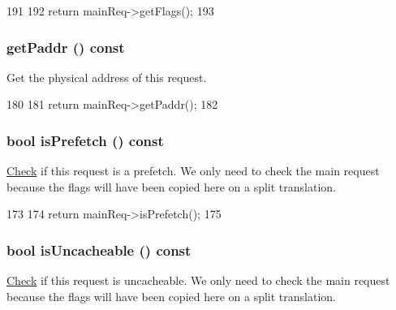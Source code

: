 \begin{DoxyCode}
191     {
192         return mainReq->getFlags();
193     }
\end{DoxyCode}
\hypertarget{classWholeTranslationState_ad988a42a876d1cbc56556e1317e0f107}{
\subsubsection[{getPaddr}]{ getPaddr () const}}
\label{classWholeTranslationState_ad988a42a876d1cbc56556e1317e0f107}
Get the physical address of this request. 


\begin{DoxyCode}
180     {
181         return mainReq->getPaddr();
182     }
\end{DoxyCode}
\hypertarget{classWholeTranslationState_a1eef1bb814a1f77346aba1648fb6d1c9}{
\subsubsection[{isPrefetch}]{\setlength{\rightskip}{0pt plus 5cm}bool isPrefetch () const}}
\label{classWholeTranslationState_a1eef1bb814a1f77346aba1648fb6d1c9}
\hyperlink{classCheck}{Check} if this request is a prefetch. We only need to check the main request because the flags will have been copied here on a split translation. 


\begin{DoxyCode}
173     {
174         return mainReq->isPrefetch();
175     }
\end{DoxyCode}
\hypertarget{classWholeTranslationState_a70c74b2809417ea8701dd6ba9e34312d}{
\subsubsection[{isUncacheable}]{\setlength{\rightskip}{0pt plus 5cm}bool isUncacheable () const}}
\label{classWholeTranslationState_a70c74b2809417ea8701dd6ba9e34312d}
\hyperlink{classCheck}{Check} if this request is uncacheable. We only need to check the main request because the flags will have been copied here on a split translation. 


